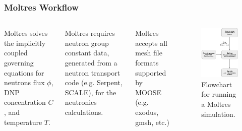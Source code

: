 \begin{frame}
	\frametitle{Moltres Workflow}
	\begin{columns}
		\column{5cm}
		Moltres solves the implicitly coupled governing equations for
		neutrons flux $\phi$, \gls{DNP} concentration $C$, and
		temperature $T$.
		
		\vspace{.2cm}
		Moltres requires neutron group constant data, generated from a neutron
		transport code (e.g. Serpent, SCALE), for the neutronics calculations.
		
		\vspace{.2cm}
		Moltres accepts all mesh file formats supported by MOOSE (e.g. exodus,
		gmsh, etc.)
		\column{5cm}
		\begin{figure}
			\centering
			\includegraphics[width=.9\textwidth]{./images/flowchart}
			\caption{Flowchart for running a Moltres simulation.}
			\label{fig:flowchart}
		\end{figure}
	\end{columns}
\end{frame}

